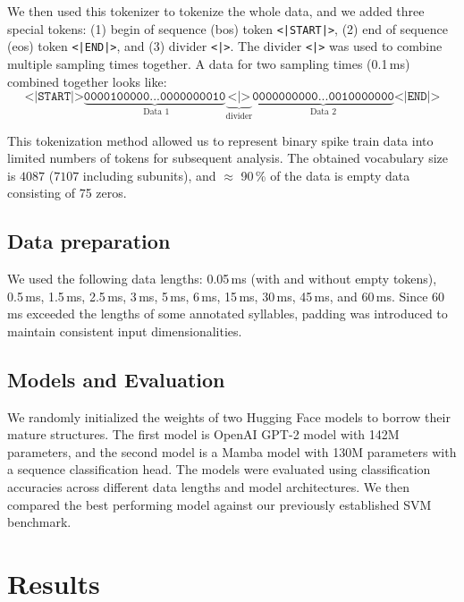 \documentclass[../CLthesis.tex]{subfiles}
\begin{document}
We then used this tokenizer to tokenize the whole data, and we added three special tokens: (1) begin of sequence (bos) token \texttt{<|START|>}, (2) end of sequence (eos) token \texttt{<|END|>}, and (3) divider \texttt{<|>}. The divider \texttt{<|>} was used to combine multiple sampling times together. A data for two sampling times (0.1\,ms) combined together looks like:
\begin{equation*}
\texttt{<|START|>}\underbrace{\texttt{0000100000...0000000010}}_{\text{ Data 1}}\underbrace{\texttt{<|>}}_{\text{divider}}\underbrace{\texttt{0000000000...0010000000}}_{\text{Data 2}}\texttt{<|END|>}
\end{equation*}

This tokenization method allowed us to represent binary spike train data into limited numbers of tokens for subsequent analysis. The obtained vocabulary size is $4087$ ($7107$ including subunits), and $\approx$ 90\,\% of the data is empty data consisting of 75 zeros.

\subsection{Data preparation} 
We used the following data lengths: 0.05\,ms (with and without empty tokens), 0.5\,ms, 1.5\,ms, 2.5\,ms, 3\,ms, 5\,ms, 6\,ms, 15\,ms, 30\,ms, 45\,ms, and 60\,ms. Since 60\,ms exceeded the lengths of some annotated syllables, padding was introduced to maintain consistent input dimensionalities. 
\subsection{Models and Evaluation} 
We randomly initialized the weights of two Hugging Face models to borrow their mature structures. The first model is OpenAI GPT-2 model \citep{Radford2019-gx} with 142M parameters, and the second model is a Mamba \citep{Gu2023-vw} model with 130M parameters with a sequence classification head. The models were evaluated using classification accuracies across different data lengths and model architectures. We then compared the best performing model against our previously established SVM benchmark.
\section{Results}
\end{document}
